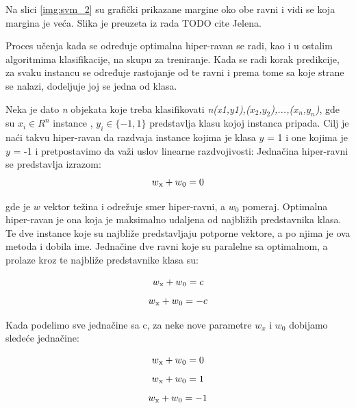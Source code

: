 \documentclass[12pt,oneside]{memoir}
\begin{document}
Na slici \ref{img:svm_2} su grafički prikazane margine oko obe ravni i vidi se koja margina je veća. Slika je preuzeta iz rada TODO cite Jelena. 

Proces učenja kada se određuje optimalna hiper-ravan se radi, kao i u ostalim algoritmima klasifikacije, na skupu za treniranje.  Kada se radi korak predikcije, za svaku instancu se određuje rastojanje od te ravni i prema tome sa koje strane se nalazi, dodeljuje joj se jedna od klasa. 

Neka je dato \textit{n} objekata koje treba klasifikovati \textit{n\normalfont(x1,y1\normalfont),\normalfont($x_2$,$y_2$\normalfont),...,\normalfont($x_n$,$y_n$\normalfont)},  gde su $x_i \in R^n$ instance ,   $y_i \in \{-1,1\}$ predstavlja klasu kojoj instanca pripada.  Cilj je naći takvu hiper-ravan da razdvaja instance kojima je klasa $y$ = 1 i one kojima je $y$ = -1 i pretpostavimo da važi uslov linearne razdvojivosti:
Jednačina hiper-ravni se predstavlja izrazom:
\begin{equation}
	w\textsubscript{x}+w\textsubscript{0} = 0
\end{equation}

gde je $w$ vektor težina i odrežuje smer hiper-ravni, a $w_0$ pomeraj.  Optimalna hiper-ravan je ona koja je maksimalno udaljena od najbližih predstavnika klasa.  Te dve instance koje su najbliže predstavljaju potporne vektore, a po njima je ova metoda i dobila ime. Jednačine dve ravni koje su paralelne sa optimalnom,  a prolaze kroz te najbliže predstavnike klasa su:

\begin{equation}
	w\textsubscript{x}+w\textsubscript{0} = c \\
\end{equation}
\begin{equation}
	w\textsubscript{x}+w\textsubscript{0} = -c
\end{equation}


Kada podelimo sve jednačine sa c, za neke nove parametre $w_x$ i $w_0$ dobijamo sledeće jednačine:

\begin{equation}
	w\textsubscript{x}+w\textsubscript{0} = 0
\end{equation}
\begin{equation}
	w\textsubscript{x}+w\textsubscript{0} = 1
\end{equation}
\begin{equation}
	w\textsubscript{x}+w\textsubscript{0} = -1
\end{equation}
\end{document}
